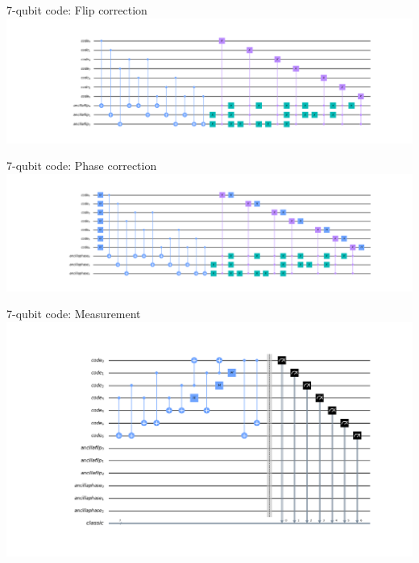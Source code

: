 \documentclass{beamer}
\begin{document}
\begin{frame}{7-qubit code: Flip correction}
  \includegraphics[width=\textwidth]{7qb_flip}
\end{frame}

\begin{frame}{7-qubit code: Phase correction}
  \includegraphics[width=\textwidth]{7qb_phase}
\end{frame}

\begin{frame}{7-qubit code: Measurement}
  \includegraphics[width=\textwidth]{7qb_end}
\end{frame}
\end{document}
